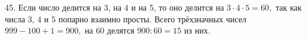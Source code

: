 45. Если число делится на 3, на 4 и на 5, то оно делится на $3\cdot4\cdot5=60,$ так как числа 3, 4 и 5 попарно взаимно просты. Всего трёхзначных чисел $999-100+1=900,$ на 60 делятся $900:60=15$ из них.\\
